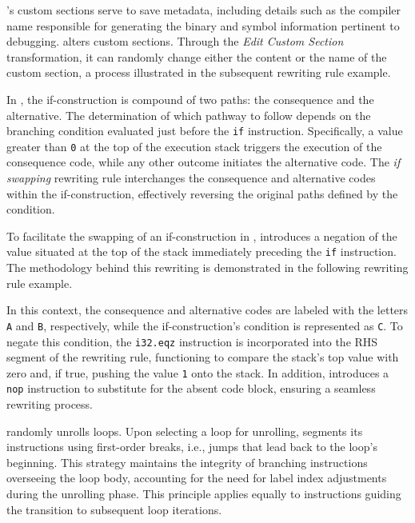


 \Wasm's custom sections serve to save metadata, including details such as the compiler name responsible for generating the binary and symbol information pertinent to debugging. 
\tool alters custom sections. 
Through the \emph{Edit Custom Section} transformation, it can randomly change either the content or the name of the custom section, a process illustrated in the subsequent rewriting rule example.




 In \Wasm, the if-construction is compound of two paths: the consequence and the alternative. 
The determination of which pathway to follow depends on the branching condition evaluated just before the \texttt{if} instruction. 
Specifically, a value greater than \texttt{0} at the top of the execution stack triggers the execution of the consequence code, while any other outcome initiates the alternative code.
The \emph{if swapping} rewriting rule interchanges the consequence and alternative codes within the if-construction, effectively reversing the original paths defined by the condition.



To facilitate the swapping of an if-construction in \Wasm, \tool introduces a negation of the value situated at the top of the stack immediately preceding the \texttt{if} instruction. 
The methodology behind this rewriting is demonstrated in the following rewriting rule example.




In this context, the consequence and alternative codes are labeled with the letters \texttt{A} and \texttt{B}, respectively, while the if-construction's condition is represented as \texttt{C}. 
To negate this condition, the \texttt{i32.eqz} instruction is incorporated into the RHS segment of the rewriting rule, functioning to compare the stack's top value with zero and, if true, pushing the value \texttt{1} onto the stack.
In addition, \tool introduces a \texttt{nop} instruction to substitute for the absent code block, ensuring a seamless rewriting process.


 \tool randomly unrolls loops.
Upon selecting a loop for unrolling, \tool segments its instructions using first-order breaks, i.e., jumps that lead back to the loop's beginning. 
This strategy maintains the integrity of branching instructions overseeing the loop body, accounting for the need for label index adjustments during the unrolling phase. 
This principle applies equally to instructions guiding the transition to subsequent loop iterations.


